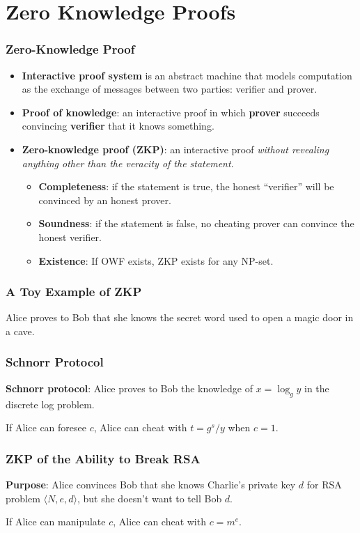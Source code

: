 \section{Zero Knowledge Proofs}
\begin{frame}\frametitle{Zero-Knowledge Proof}
\begin{itemize}
\item \textbf{Interactive proof system} is an abstract machine that models computation as the exchange of messages between two parties: verifier and prover.
\item \textbf{Proof of knowledge}: an interactive proof in which \textbf{prover} succeeds convincing \textbf{verifier} that it knows something.
\item \textbf{Zero-knowledge proof (ZKP)}: an interactive proof \emph{without revealing anything other than the veracity of the statement}.
\begin{itemize}
\item \textbf{Completeness}: if the statement is true, the honest ``verifier'' will be convinced by an honest prover.
\item \textbf{Soundness}: if the statement is false, no cheating prover can convince the honest verifier.
\item \textbf{Existence}: If OWF exists, ZKP exists for any NP-set.
\end{itemize}
\end{itemize}
\end{frame}
\begin{frame}\frametitle{A Toy Example of ZKP}
Alice {\color{red} \LARGE \Ladiesroom} proves to Bob {\color{blue} \LARGE \Gentsroom} that she knows the secret word used to open a magic door in a cave.
\begin{figure}
\begin{center}

\end{center}
\end{figure}
\end{frame}
\begin{frame}\frametitle{Schnorr Protocol}
\textbf{Schnorr protocol}: Alice proves to Bob the knowledge of $x=\log_gy$ in the discrete log problem.
\begin{figure}
\begin{center}

\end{center}
\end{figure}
If Alice can foresee $c$, Alice can cheat with $t=g^s/y$ when $c=1$.
\end{frame}
\begin{frame}\frametitle{ZKP of the Ability to Break RSA}
\textbf{Purpose}: Alice convinces Bob that she knows Charlie's private key $d$ for RSA problem $\langle N,e,d \rangle$, but she doesn't want to tell Bob $d$.
\begin{figure}
\begin{center}

\end{center}
\end{figure}
If Alice can manipulate $c$, Alice can cheat with $c = m^e$.
\end{frame}
